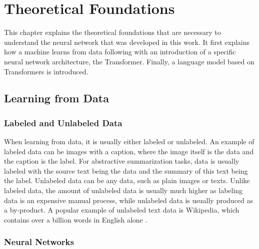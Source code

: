 \chapter{Theoretical Foundations}\label{ch:theoretical-foundations}

This chapter explains the theoretical foundations that are necessary to understand the neural network that was developed in this work.
It first explains how a machine learns from data following with an introduction of a specific neural network architecture, the Transformer.
Finally, a language model based on Transformers is introduced.


\section{Learning from Data}

\subsection{Labeled and Unlabeled Data}

When learning from data, it is usually either labeled or unlabeled.
An example of labeled data can be images with a caption, where the image itself is the data and the caption is the label.
For abstractive summarization tasks, data is usually labeled with the source text being the data and the summary of this text being the label.
Unlabeled data can be any data, such as plain images or texts.
Unlike labeled data, the amount of unlabeled data is usually much higher as labeling data is an expensive manual process, while unlabeled data is usually produced as a by-product.
A popular example of unlabeled text data is Wikipedia, which contains over a billion words in English alone \cite{wikipediaStats}. 


\subsection{Neural Networks}

